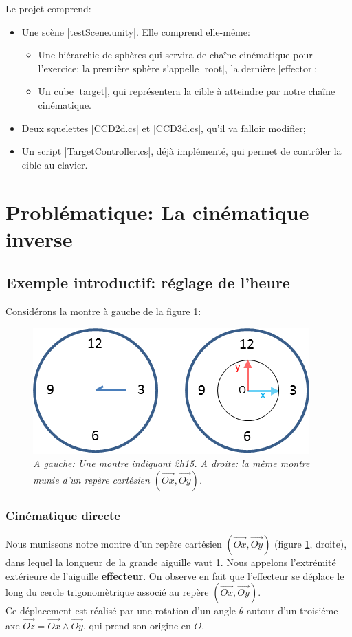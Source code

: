 \documentclass{article}
\begin{document}
Le projet comprend:
\begin{itemize}
	\item Une sc\`ene |testScene.unity|. Elle comprend elle-m\^eme:
		\begin{itemize} 
			\item Une hi\'erarchie de sph\`eres qui servira de cha\^ine cin\'ematique pour l'exercice; la premi\`ere sph\`ere s'appelle |root|, la derni\`ere |effector|;
			\item Un cube |target|, qui repr\'esentera la cible \`a atteindre par notre cha\^ine cin\'ematique.
		\end{itemize}
	\item Deux squelettes |CCD2d.cs| et |CCD3d.cs|, qu'il va falloir modifier;
	\item Un script |TargetController.cs|, d\'ej\`a impl\'ement\'e, qui permet de contr\^oler la cible au clavier.
\end{itemize}

\section{Probl\'ematique: La cin\'ematique inverse}
\label{problem}

\subsection{Exemple introductif: r\'eglage de l'heure}
\label{montreex}
Consid\'erons la montre \`a gauche de la figure \ref{watch}:
\begin{figure}[htb]
  \centering
    \includegraphics[]{watch2}
  \caption{
          \textit{A gauche: Une montre indiquant 2h15. A droite: la m\^eme montre munie d'un rep\`ere cart\'esien $(\vec{Ox}, \vec{Oy})$.}}
		   \label{watch}
\end{figure}

\subsubsection*{Cin\'ematique directe}
Nous munissons notre montre d'un rep\`ere cart\'esien $(\vec{Ox}, \vec{Oy})$ (figure \ref{watch}, droite), dans lequel la longueur
de la grande aiguille vaut 1.
Nous appelons l'extr\'emit\'e ext\'erieure de l'aiguille \textbf{effecteur}. On observe en fait que l'effecteur se d\'eplace
le long du cercle trigonom\`etrique associ\'e au rep\`ere $(\vec{Ox}, \vec{Oy})$. \\
Ce d\'eplacement est r\'ealis\'e par une rotation d'un angle $\theta$ autour d'un troisi\'eme axe $\vec{Oz} = \vec{Ox} \wedge \vec{Oy}$, qui prend
son origine en $O$.
\end{document}
